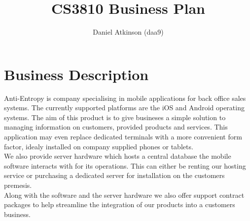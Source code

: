 \documentclass{article}
\begin{document}
\title{CS3810 Business Plan}

\author{Daniel Atkinson (daa9)}
\maketitle

\newpage
\tableofcontents
\newpage


\section{Business Description}
Anti-Entropy is company specialising in mobile applications for back office sales systems.  The currently supported platforms are the iOS and Android operating systems.  The aim of this product is to give busineses a simple solution to managing information on customers, provided products and services.  This application may even replace dedicated terminals with a more convenient form factor, idealy installed on company supplied phones or tablets.
\\We also provide server hardware which hosts a central database the mobile software interacts with for its operations.  This can either be renting our hosting service or purchasing a dedicated server for installation on the customers premesis.
\\Along with the software and the server hardware we also offer support contract packages to help streamline the integration of our products into a customers business.
\end{document}
